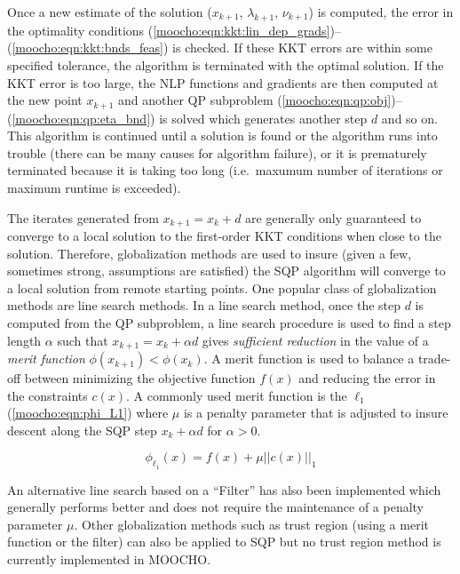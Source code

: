 \documentclass[pdf,ps2pdf,11pt]{SANDreport}
\begin{document}
Once a new estimate of the solution ($x_{k+1}$, $\lambda_{k+1}$, $\nu_{k+1}$)
is computed, the error in the optimality conditions
(\ref{moocho:eqn:kkt:lin_dep_grads})--(\ref{moocho:eqn:kkt:bnds_feas}) is
checked.  If these KKT errors are within some specified tolerance, the
algorithm is terminated with the optimal solution.  If the KKT error is too
large, the NLP functions and gradients are then computed at the new point
$x_{k+1}$ and another QP subproblem
(\ref{moocho:eqn:qp:obj})--(\ref{moocho:eqn:qp:eta_bnd}) is solved which
generates another step $d$ and so on.  This algorithm is continued until a
solution is found or the algorithm runs into trouble (there can be many causes
for algorithm failure), or it is prematurely terminated because it is taking
too long (i.e.\ maxumum number of iterations or maximum runtime is exceeded).

The iterates generated from $x_{k+1} = x_k + d$ are generally only guaranteed
to converge to a local solution to the first-order KKT conditions when close
to the solution.  Therefore, globalization methods are used to insure (given a
few, sometimes strong, assumptions are satisfied) the SQP algorithm will
converge to a local solution from remote starting points.  One popular class
of globalization methods are line search methods.  In a line search method,
once the step $d$ is computed from the QP subproblem, a line search procedure
is used to find a step length $\alpha$ such that $x_{k+1} = x_k + {}\alpha d$
gives {\em sufficient reduction} in the value of a {\em merit function}
$\phi(x_{k+1}) < \phi(x_k)$.  A merit function is used to balance a trade-off
between minimizing the objective function $f(x)$ and reducing the error in the
constraints $c(x)$.  A commonly used merit function is the $\ell_1$
(\ref{moocho:eqn:phi_L1}) where $\mu$ is a penalty parameter that is adjusted
to insure descent along the SQP step $x_k + \alpha d$ for $\alpha > 0$.

{\bsinglespace
\begin{equation}
\phi_{\ell_1}(x) = f(x) + \mu ||c(x)||_1
\label{moocho:eqn:phi_L1}
\end{equation}
\esinglespace}

An alternative line search based on a ``Filter'' has also been implemented
which generally performs better and does not require the maintenance of a
penalty parameter $\mu$.  Other globalization methods such as trust region
(using a merit function or the filter) can also be applied to SQP but no trust
region method is currently implemented in MOOCHO.
\end{document}
